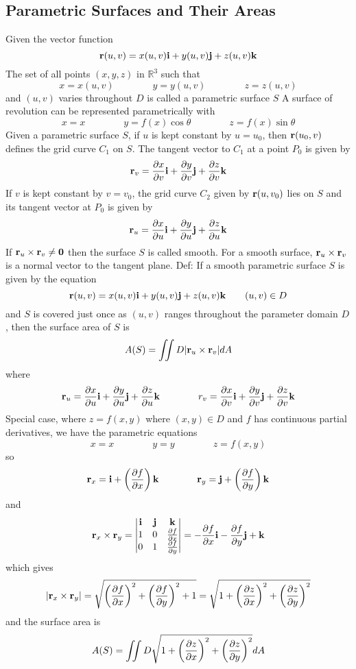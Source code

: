 \documentclass{article}
\begin{document}
    \subsection{Parametric Surfaces and Their Areas}
    \begin{outline}
        \1 Given the vector function \[\vb r(u,v)=x(u,v)\vb i+y(u,v)\vb j+z(u,v)\vb k\] The set of all points \((x,y,z)\) in \(\mathbb R^3\) such that \[x=x(u,v)\qquad\qquad y=y(u,v)\qquad\qquad z=z(u,v)\] and \((u,v)\) varies throughout $D$ is called a parametric surface $S$
        \1 A surface of revolution can be represented parametrically with \[x=x\qquad\qquad y=f(x)\cos\theta\qquad\qquad z=f(x)\sin\theta\]
        \1 Given a parametric surface $S$, if \(u\) is kept constant by \(u=u_0\), then \(\vb r(u_0,v)\) defines the grid curve \(C_1\) on \(S\). The tangent vector to \(C_1\) at a point \(P_0\) is given by \[\vb r_v=\pdv{x}{v}(u_0,v_0)\vb i+\pdv{y}{v}(u_0,v_0)\vb j+\pdv{z}{v}(u_0,v_0)\vb k\] If $v$ is kept constant by \(v=v_0\), the grid curve \(C_2\) given by \(\vb r(u,v_0)\) lies on $S$ and its tangent vector at \(P_0\) is given by \[\vb r_u=\pdv{x}{u}(u_0,v_0)\vb i+\pdv{y}{u}(u_0,v_0)\vb j+\pdv{z}{u}(u_0,v_0)\vb k\] If \(\vb r_u\times\vb r_v\neq\vb 0\) then the surface $S$ is called smooth. For a smooth surface, \(\vb r_u\times\vb r_v\) is a normal vector to the tangent plane. 
        \1 Def: If a smooth parametric surface $S$ is given by the equation \[\vb r(u,v)=x(u,v)\vb i+y(u,v)\vb j+z(u,v)\vb k\qquad(u,v)\in D\] and $S$ is covered just once as \((u,v)\) ranges throughout the parameter domain $D$, then the surface area of $S$ is \[A(S)=\iint\limits D|\vb r_u\times\vb r_v|dA\] where \[\vb r_u=\pdv{x}{u}\vb i+\pdv{y}{u}\vb j+\pdv{z}{u}\vb k\qquad\qquad r_v=\pdv{x}{v}\vb i+\pdv{y}{v}\vb j+\pdv{z}{v}\vb k\]
        \1 Special case, where \(z=f(x,y)\) where \((x,y)\in D\) and \(f\) has continuous partial derivatives, we have the parametric equations \[x=x\qquad\qquad y=y\qquad\qquad z=f(x,y)\] so \[\vb r_x=\vb i+\left(\pdv{f}{x}\right)\vb k\qquad\qquad\vb r_y=\vb j+\left(\pdv{f}{y}\right)\vb k\] and \[\vb r_x\times\vb r_y=\begin{vmatrix}\vb i & \vb j & \vb k \\ 1 & 0 & \pdv{f}{x} \\ 0 & 1 & \pdv{f}{y}\end{vmatrix}=-\pdv{f}{x}\vb i-\pdv{f}{y}\vb j+\vb k\] which gives \[|\vb r_x\times\vb r_y|=\sqrt{\left(\pdv{f}{x}\right)^2+\left(\pdv{f}{y}\right)^2+1}=\sqrt{1+\left(\pdv{z}{x}\right)^2+\left(\pdv{z}{y}\right)^2}\] and the surface area is \[A(S)=\iint\limits D\sqrt{1+\left(\pdv{z}{x}\right)^2+\left(\pdv{z}{y}\right)^2}dA\]

    \end{outline}
\end{document}
